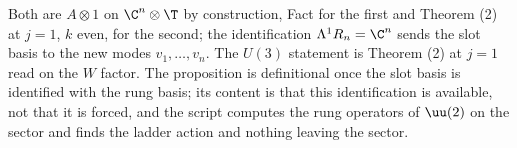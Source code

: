 Both are $A \otimes 1$ on $\C^{n} \otimes \T$ by construction, Fact  for the first and Theorem (2) at $j = 1$, $k$ even, for the second; the identification $\Lambda^{1}R_{n} = \C^{n}$ sends the slot basis to the new modes $v_{1}, \ldots, v_{n}$. The $U(3)$ statement is Theorem (2) at $j = 1$ read on the $W$ factor. The proposition is definitional once the slot basis is identified with the rung basis; its content is that this identification is available, not that it is forced, and the script computes the rung operators of $\uu(2)$ on the sector and finds the ladder action and nothing leaving the sector.

